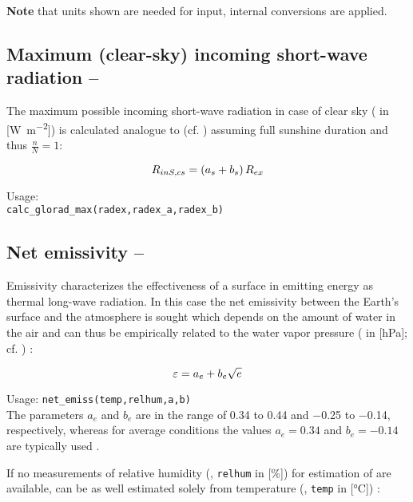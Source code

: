 \textbf{Note} that units shown are needed for input, internal conversions are applied.


\subsection{Maximum (clear-sky) incoming short-wave radiation -- \radShortwaveInClearsky} \label{sec:meteo:radshortmax}
The maximum possible incoming short-wave radiation in case of clear sky (\radShortwaveInClearsky{} in [\si{\watt\per\metre\squared}]) is calculated analogue to \radShortwaveIn{} (cf. ) assuming full sunshine duration and thus $\frac{n}{N} = \num{1}$:

\begin{equation}\label{eqn:meteo:radshortmax}
R_{inS,cs}{} = \left( a_s + b_s \right) R_{ex}{}
\end{equation}

\noindent
Usage:\\
\verb!calc_glorad_max(radex,radex_a,radex_b)!


\subsection{Net emissivity -- \emissivity} \label{sec:meteo:emiss}
Emissivity characterizes the effectiveness of a surface in emitting energy as thermal long-wave radiation. In this case the net emissivity between the Earth's surface and the atmosphere is sought which depends on the amount of water in the air and can thus be empirically related to the water vapor pressure (\vaporPressure{} in [\si{\hecto\pascal}]; cf. ) \citep{Maidment1993}:

\begin{equation}\label{eqn:meteo:emis_1}
\varepsilon{} = a_e + b_e \sqrt{e{}}
\end{equation}

\noindent
Usage:
\verb!net_emiss(temp,relhum,a,b)!\\

The parameters $a_e$ and $b_e$ are in the range of \num{0.34} to \num{0.44} and \num{-0.25} to \num{-0.14}, respectively, whereas for average conditions the values $a_e = \num{0.34}$ and $b_e = \num{-0.14}$ are typically used \citep{Maidment1993}.

If no measurements of relative humidity (\relHumidity{}, \verb!relhum! in [\si{\percent}]) for estimation of \vaporPressure{} are available, \emissivity{} can be as well estimated solely from temperature (\airtemp{}, \verb!temp! in [\si{\degreeCelsius}]) \citep{Maidment1993}:

